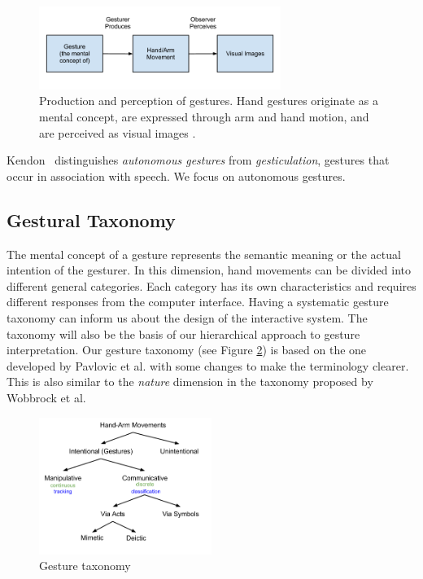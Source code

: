 \begin{figure}[tbh]
  \centering
  \includegraphics[width=0.7\textwidth]{figures/gesture_production.png} 
  \caption{Production and perception of gestures. Hand gestures originate as a
  mental concept, are expressed through arm and hand motion, and are perceived
  as visual images \cite{Pavlovic97}.}
  \label{fig:gesture_production}
\end{figure}

Kendon~\cite{kendon86} distinguishes \textit{autonomous gestures} from
\textit{gesticulation}, gestures that occur in association with speech. We focus
on autonomous gestures.

\subsection{Gestural Taxonomy}\label{sec:taxonomy}
The mental concept of a gesture represents the semantic meaning or the
actual intention of the gesturer. In this dimension, hand movements can be
divided into different general categories. Each category has its own characteristics and requires different responses from the computer interface. Having a systematic gesture taxonomy can inform
us about the design of the interactive system. The taxonomy will also be the
basis of our hierarchical approach to gesture interpretation. Our gesture
taxonomy (see Figure \ref{fig:taxonomy}) is based on the one developed by Pavlovic et al.
\cite{Pavlovic97} with some changes to make the terminology clearer. This is
also similar to the \textit{nature} dimension in the taxonomy proposed by
Wobbrock et al. \cite{wobbrock09}

\begin{figure}[h]
  \centering
  \includegraphics[width=0.5\textwidth]{figures/taxonomy.png} 
  \caption{Gesture taxonomy}
  \label{fig:taxonomy}
\end{figure}

